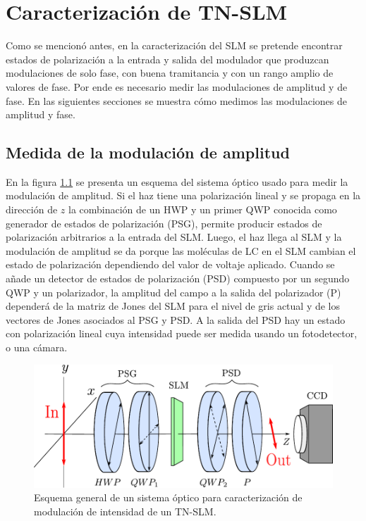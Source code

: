 \chapter{Caracterización de TN-SLM}
\label{cha:Gen_carac}
\label{sec:ChGV_Caracterizacion_de_SLM}

Como se mencionó antes, en la caracterización del SLM se pretende
encontrar estados de polarización a la entrada y salida del modulador
que produzcan modulaciones de solo fase, con buena tramitancia y con
un rango amplio de valores de fase. 
Por ende es necesario medir las modulaciones de amplitud y de fase. En
las siguientes secciones se muestra cómo medimos las modulaciones de
amplitud y fase. 

\section{Medida de la modulación de amplitud}
\label{sec:ChGV_med_mod_amp}

En la figura \ref{fig:PSG_PSD} se presenta un esquema del sistema
óptico usado para medir la modulación de amplitud. Si el haz tiene una
polarización lineal y se propaga en la dirección de $z$ la combinación
de un HWP y un primer QWP conocida como generador de estados de
polarización (PSG), permite producir estados de polarización
arbitrarios a la entrada del SLM. Luego, el haz llega al SLM y la modulación de amplitud se
da porque las moléculas de LC en el SLM cambian el estado de
polarización dependiendo del valor de voltaje aplicado. Cuando se añade un detector de estados de
polarización (PSD) compuesto por un segundo QWP y un polarizador, la amplitud del campo a la salida del polarizador
(P) dependerá de la matriz de Jones del SLM para el nivel de gris
actual y de los vectores de Jones asociados al PSG y PSD. A la salida
del PSD hay un estado con polarización lineal cuya intensidad puede
ser medida usando un fotodetector, o una cámara. 
 \begin{figure}[h!]
\centering
\includegraphics[scale=.8]{PSG_PSD.pdf}
\caption[Esquema de un sistema generador y analizador de estados de
polarización]{Esquema general de un sistema óptico para
  caracterización de modulación de intensidad de un TN-SLM.}
\label{fig:PSG_PSD}
\end{figure}

